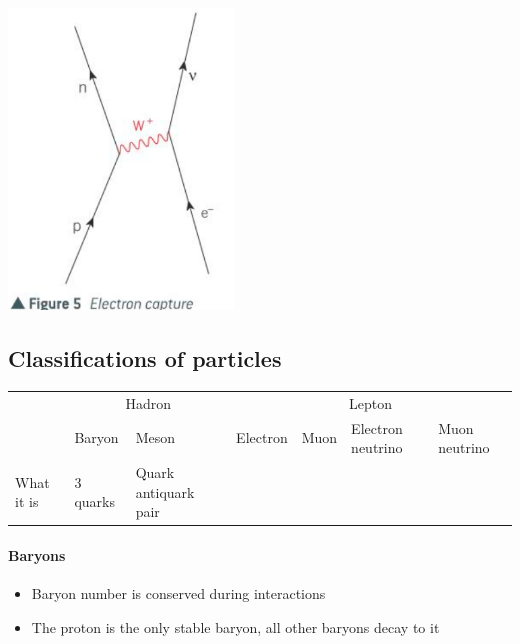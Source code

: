 \documentclass[12pt]{article}
\begin{document}
\includegraphics[width=6cm]{electron_capture.png}
\subsection{Classifications of particles}
{\renewcommand{\arraystretch}{2}
\begin{tabularx}{\textwidth}{|X|X|X|X|X|X|X|}
\hline
&\multicolumn{2}{|c|}{\centering Hadron}&\multicolumn{4}{|c|}{\centering Lepton}\\
\cline{2-7}
&Baryon&Meson&Electron&Muon&Electron neutrino&Muon neutrino\\
\hline
What it is&3 quarks&Quark antiquark pair&&&&\\
\hline
\end{tabularx}}
\paragraph{Baryons}
\begin{itemize}
\item Baryon number is conserved during interactions
\item The proton is the only stable baryon, all other baryons decay to it
\end{itemize}
\end{document}
